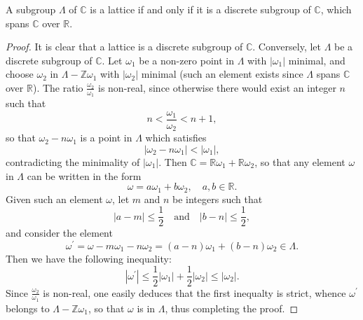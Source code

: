 \begin{lem}
  \label{lem:latice-iff-discrete}
  A subgroup $\Lambda$ of $\mathbb{C}$ is a lattice if and only if it is a discrete
  subgroup of $\mathbb{C}$, which spans $\mathbb{C}$ over $\mathbb{R}$.
\end{lem}
\begin{proof}
  It is clear that a lattice is a discrete subgroup of $\mathbb{C}$.  Conversely, let
  $\Lambda$ be a discrete subgroup of $\mathbb{C}$.  Let $\omega_{1}$ be a non-zero
  point in $\Lambda$ with $|\omega_{1}|$ minimal, and choose $\omega_{2}$ in $\Lambda
  - \mathbb{Z}\omega_{1}$ with $|\omega_{2}|$ minimal (such an element exists since
  $\Lambda$ spans $\mathbb{C}$ over $\mathbb{R}$).  The ratio
  $\frac{\omega_{2}}{\omega_{1}}$ is non-real, since otherwise there would exist an
  integer $n$ such that
  \begin{equation*}
    n < \frac{\omega_{1}}{\omega_{2}} < n + 1,
  \end{equation*}
  so that $\omega_{2} - n\omega_{1}$ is a point in $\Lambda$ which satisfies
  \begin{equation*}
    | \omega_{2} - n \omega_{1} | < |\omega_{1} |,
  \end{equation*}
  contradicting the minimality of $|\omega_{1}|$.  Then $\mathbb{C} =
  \mathbb{R}\omega_{1} + \mathbb{R}\omega_{2}$, so that any element $\omega$ in
  $\Lambda$ can be written in the form
  \begin{equation*}
    \omega = a\omega_{1} + b\omega_{2}, \quad a,b \in \mathbb{R}.
  \end{equation*}
  Given such an element $\omega$, let $m$ and $n$ be integers such that
  \begin{equation*}
    |a - m| \leq \frac{1}{2} \quad \text{and} \quad |b - n| \leq \frac{1}{2},
  \end{equation*}
  and consider the element
  \begin{equation*}
    \omega^{\prime} = \omega - m\omega_{1} - n\omega_{2} = (a - n)\omega_{1} + (b -
    n)\omega_{2} \in \Lambda.
  \end{equation*}
  Then we have the following inequality:
  \begin{equation*}
    |\omega^{\prime}| \leq \frac{1}{2}|\omega_{1}| + \frac{1}{2}|\omega_{2}| \leq |\omega_{2}|.
  \end{equation*}
  Since $\frac{\omega_{2}}{\omega_{1}}$ is non-real, one easily deduces that the
  first inequalty is strict, whence $\omega^{\prime}$ belongs to $\Lambda -
  \mathbb{Z}\omega_{1}$, so that $\omega$ is in $\Lambda$, thus completing the proof.
\end{proof}


